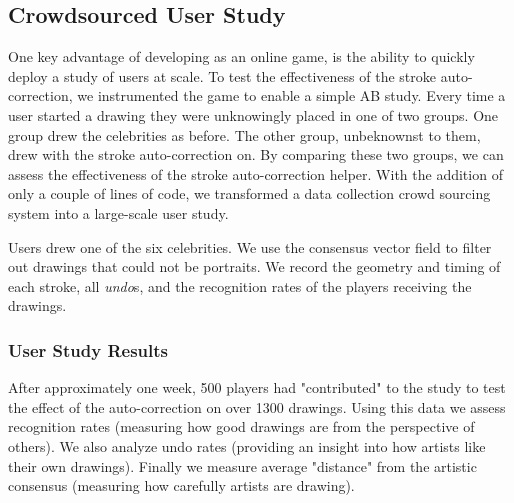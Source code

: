 \subsection {Crowdsourced User Study}

One key advantage of developing \daf as an online game, is the ability to quickly deploy a study of users at scale. To test the effectiveness of the stroke auto-correction, we instrumented the game to enable a simple AB study. Every time a user started a drawing they were unknowingly placed in one of two groups. One group drew the celebrities as before. The other group, unbeknownst to them, drew with the stroke auto-correction on. By comparing these two groups, we can assess the effectiveness of the stroke auto-correction helper. With the addition of only a couple of lines of code, we transformed a data collection crowd sourcing system into a large-scale user study.

Users drew one of the six celebrities. We use the consensus vector field to filter out drawings that could not be portraits. We record the geometry and timing of each stroke, all {\em undo}s, and the recognition rates of the players receiving the drawings.

\subsubsection {User Study Results}

After approximately one week, 500 players had "contributed" to the study to test the effect of the auto-correction on over 1300 drawings. Using this data we assess recognition rates (measuring how good drawings are from the perspective of others). We also analyze undo rates (providing an insight into how artists like their own drawings). Finally we measure average "distance" from the artistic consensus (measuring how carefully artists are drawing).


